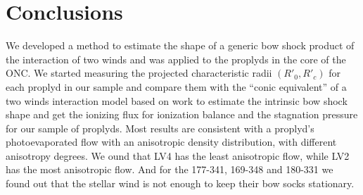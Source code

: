 \section{Conclusions}
\label{sec:conc}


We developed a method to estimate the shape of a generic bow shock product of the
interaction of two winds and was applied to the proplyds in the core of the ONC.
We started measuring the projected characteristic radii $(R'_0,R'_c)$ for each proplyd in our
sample and compare them with the ``conic equivalent'' of a two winds interaction model based 
on \CRW{} work to estimate the intrinsic bow shock shape and get the ionizing flux for ionization balance 
and the stagnation pressure for our sample of proplyds.
Most results are consistent with a proplyd's photoevaporated flow with an anisotropic density
distribution, with different anisotropy degrees. We ound that LV4 has the least anisotropic flow,
while LV2 has the most anisotropic flow. And for the 177-341, 169-348 and 180-331 we found out that 
the stellar wind is not enough to keep their bow socks stationary.

